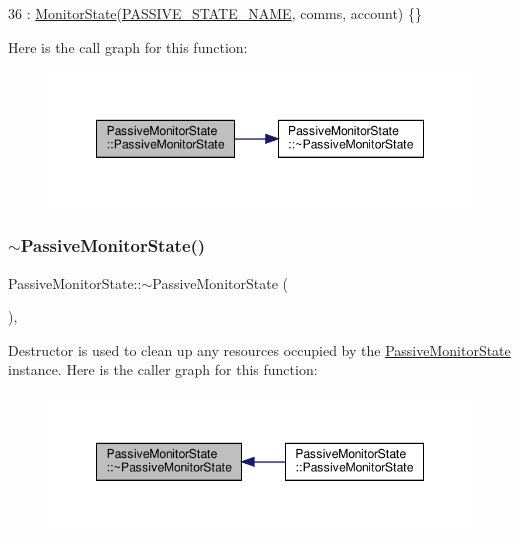 \begin{DoxyCode}
36         : \hyperlink{class_monitor_state_ace027ab9e5703ac4e4b808eeebc3c961}{MonitorState}(\hyperlink{_passive_monitor_state_8h_a01326d372e7d0a078fe71bdab8adf0d9}{PASSIVE\_STATE\_NAME}, comms, account) \{\}
\end{DoxyCode}
Here is the call graph for this function\+:
\nopagebreak
\begin{figure}[H]
\begin{center}
\leavevmode
\includegraphics[width=348pt]{dd/d30/class_passive_monitor_state_a91d992e619e8e1d3d47875a1933542b7_cgraph}
\end{center}
\end{figure}
\mbox{\label{class_passive_monitor_state_a43a2e90a01187c40513899e4f9b5d804}} 
\subsubsection{\texorpdfstring{$\sim$\+Passive\+Monitor\+State()}{~PassiveMonitorState()}}
{\footnotesize\ttfamily Passive\+Monitor\+State\+::$\sim$\+Passive\+Monitor\+State (\begin{DoxyParamCaption}{ }\end{DoxyParamCaption})\hspace{0.3cm}{\ttfamily [override]}, {\ttfamily [default]}}

Destructor is used to clean up any resources occupied by the \hyperlink{class_passive_monitor_state}{Passive\+Monitor\+State} instance. Here is the caller graph for this function\+:
\nopagebreak
\begin{figure}[H]
\begin{center}
\leavevmode
\includegraphics[width=348pt]{dd/d30/class_passive_monitor_state_a43a2e90a01187c40513899e4f9b5d804_icgraph}
\end{center}
\end{figure}


